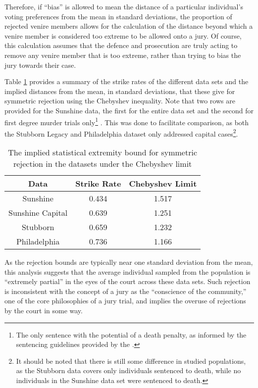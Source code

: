 Therefore, if ``bias'' is allowed to mean the distance of a particular individual's voting preferences from the mean in standard
deviations, the proportion of rejected venire members allows for the
calculation of the distance beyond which a venire member is
considered too extreme to be allowed onto a jury. Of course, this calculation assumes that the defence and prosecution are truly
acting to remove any venire member that is too extreme, rather than trying to bias the jury towards their case.

Table \ref{tab:rejbounds} provides a summary of the strike rates of the different data sets and the implied distances from the mean,
in standard deviations, that these give for symmetric rejection using the Chebyshev inequality. Note that two rows are provided
for the Sunshine data, the first for the entire data set and the
second for first degree murder trials only\footnote{The only
  sentence with the potential of a death penalty, as informed by the
  sentencing guidelines provided by the \cite{offenseclass}.} . This
was done to facilitate comparison, as both the Stubborn Legacy and Philadelphia dataset only addressed capital cases\footnote{It
  should be noted that there is still some difference in studied populations, as the Stubborn data covers only individuals
  sentenced to death, while no individuals in the Sunshine data set were sentenced to death.}.

\begin{table}[h!]
  \centering
  \caption[Chebyshev Strike Boundaries]{\footnotesize The implied statistical extremity bound for symmetric rejection in the
    datasets under the Chebyshev limit} \label{tab:rejbounds}
  \begin{tabular}{|c|c|c|} \hline
    Data & Strike Rate & Chebyshev Limit \\ \hline
    Sunshine & 0.434 & 1.517 \\
    Sunshine Capital & 0.639 & 1.251 \\
    Stubborn & 0.659 & 1.232 \\
    Philadelphia & 0.736 & 1.166 \\
    \hline
  \end{tabular}
\end{table}

As the rejection bounds are typically near one standard deviation from the mean, this analysis suggests that the
average individual sampled from the population is ``extremely
partial'' in the eyes of the court across these data sets. Such rejection is
inconsistent with the concept of a jury as the ``conscience of the community,'' one of the core philosophies of a jury trial, and
implies the overuse of rejections by the court in some way.

